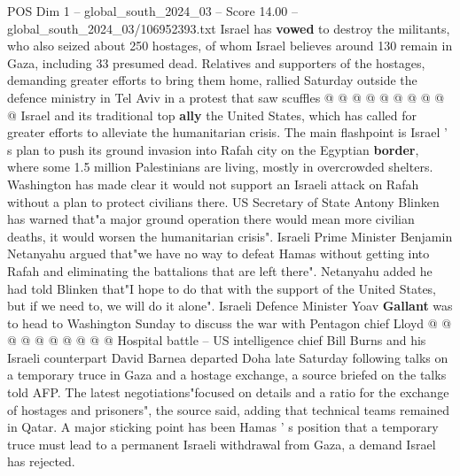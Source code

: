 \begin{textsample}{POS Dim 1 – global\_south\_2024\_03 – Score 14.00 – global\_south\_2024\_03/106952393.txt}
Israel has \textbf{vowed} to destroy the militants, who also seized about 250 hostages, of whom Israel believes around 130 remain in Gaza, including 33 presumed dead.
Relatives and supporters of the hostages, demanding greater efforts to bring them home, rallied Saturday outside the defence ministry in Tel Aviv in a protest that saw scuffles @ @ @ @ @ @ @ @ @ @ Israel and its traditional top \textbf{ally} the United States, which has called for greater efforts to alleviate the humanitarian crisis.
The main flashpoint is Israel ' s plan to push its ground invasion into Rafah city on the Egyptian \textbf{border}, where some 1.5 million Palestinians are living, mostly in overcrowded shelters.
Washington has made clear it would not support an Israeli attack on Rafah without a plan to protect civilians there.
US Secretary of State Antony Blinken has warned that"a major ground operation there would mean more civilian deaths, it would worsen the humanitarian crisis".
Israeli Prime Minister Benjamin Netanyahu argued that"we have no way to defeat Hamas without getting into Rafah and eliminating the battalions that are left there".
Netanyahu added he had told Blinken that"I hope to do that with the support of the United States, but if we need to, we will do it alone".
Israeli Defence Minister Yoav \textbf{Gallant} was to head to Washington Sunday to discuss the war with Pentagon chief Lloyd @ @ @ @ @ @ @ @ @ @ Hospital battle -- US intelligence chief Bill Burns and his Israeli counterpart David Barnea departed Doha late Saturday following talks on a temporary truce in Gaza and a hostage exchange, a source briefed on the talks told AFP.
The latest negotiations"focused on details and a ratio for the exchange of hostages and prisoners", the source said, adding that technical teams remained in Qatar.
A major sticking point has been Hamas ' s position that a temporary truce must lead to a permanent Israeli withdrawal from Gaza, a demand Israel has rejected.

\end{textsample}
